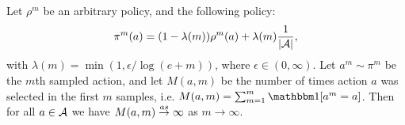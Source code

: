     \begin{lemma} \label{lem:inf_often_action_select}
        Let $\rho^m$ be an arbitrary policy, and the following policy: 
        \begin{align} 
            \pi^m(a)=(1-\lambda(m))\rho^m(a) + \lambda(m) \frac{1}{|\mathcal{A}|}, \label{appeq:ioas_policy}
        \end{align} 
        with $\lambda(m)=\min(1,\epsilon/\log(e+m))$, where $\epsilon\in(0,\infty)$. Let $a^m\sim \pi^m$ be the $m$th sampled action, and let $M(a,m)$ be the number of times action $a$ was selected in the first $m$ samples, i.e. $M(a,m)=\sum_{m=1}^m \one[a^m=a]$. Then for all $a\in\mathcal{A}$ we have $M(a,m)\overset{as}{\to}\infty$ as $m\rightarrow \infty$.
    \end{lemma}
